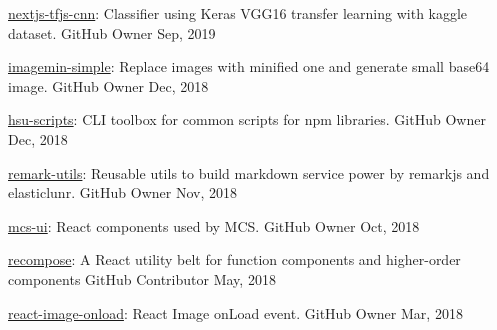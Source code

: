 \newpage
{}
\begin{cvhonors}

  \cvhonor
    {\href{https://github.com/evenchange4/nextjs-tfjs-cnn}{nextjs-tfjs-cnn}: \textmd{Classifier using Keras VGG16 transfer learning with kaggle dataset.}} %
    {GitHub} %
    {Owner} %
    {Sep, 2019} %

  \cvhonor
    {\href{https://github.com/evenchange4/imagemin-simple}{imagemin-simple}: \textmd{Replace images with minified one and generate small base64 image.}} %
    {GitHub} %
    {Owner} %
    {Dec, 2018} %

  \cvhonor
    {\href{https://github.com/evenchange4/hsu-scripts}{hsu-scripts}: \textmd{CLI toolbox for common scripts for npm libraries.}} %
    {GitHub} %
    {Owner} %
    {Dec, 2018} %

  \cvhonor
    {\href{https://github.com/evenchange4/remark-utils}{remark-utils}: \textmd{Reusable utils to build markdown service power by remarkjs and elasticlunr.}} %
    {GitHub} %
    {Owner} %
    {Nov, 2018} %

  \cvhonor
    {\href{https://github.com/Mediatek-Cloud/mcs-ui}{mcs-ui}: \textmd{React components used by MCS.}} %
    {GitHub} %
    {Owner} %
    {Oct, 2018} %

  \cvhonor
    {\href{https://github.com/acdlite/recompose}{recompose}: \textmd{A React utility belt for function components and higher-order components}} %
    {GitHub} %
    {Contributor} %
    {May, 2018} %

  \cvhonor
    {\href{https://github.com/evenchange4/react-image-onload}{react-image-onload}: \textmd{React Image onLoad event.}} %
    {GitHub} %
    {Owner} %
    {Mar, 2018} %


\end{cvhonors}
